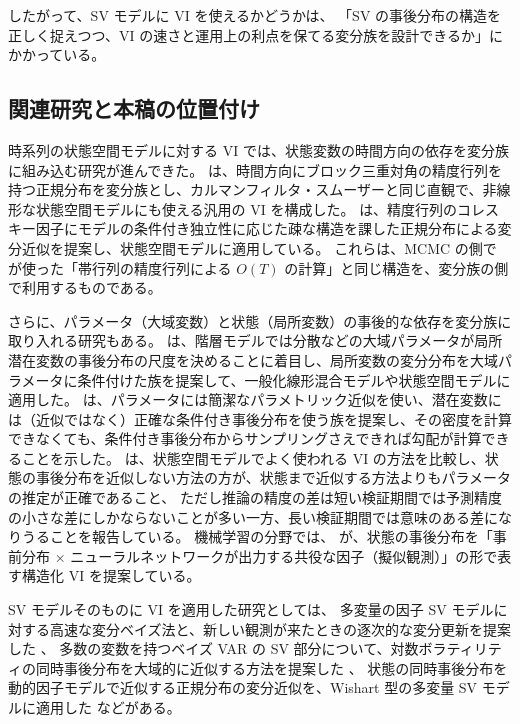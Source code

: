 したがって、SV モデルに VI を使えるかどうかは、
「SV の事後分布の構造を正しく捉えつつ、VI の速さと運用上の利点を保てる変分族を設計できるか」にかかっている。

\subsection{関連研究と本稿の位置付け}\label{sec:intro-related}

時系列の状態空間モデルに対する VI では、状態変数の時間方向の依存を変分族に組み込む研究が進んできた。
\textcite{archer2015} は、時間方向にブロック三重対角の精度行列を持つ正規分布を変分族とし、カルマンフィルタ・スムーザーと同じ直観で、非線形な状態空間モデルにも使える汎用の VI を構成した。
\textcite{tan2018} は、精度行列のコレスキー因子にモデルの条件付き独立性に応じた疎な構造を課した正規分布による変分近似を提案し、状態空間モデルに適用している。
これらは、MCMC の側で \textcite{chan2009} が使った「帯行列の精度行列による $O(T)$ の計算」と同じ構造を、変分族の側で利用するものである。

さらに、パラメータ（大域変数）と状態（局所変数）の事後的な依存を変分族に取り入れる研究もある。
\textcite{tan2020} は、階層モデルでは分散などの大域パラメータが局所潜在変数の事後分布の尺度を決めることに着目し、局所変数の変分分布を大域パラメータに条件付けた族を提案して、一般化線形混合モデルや状態空間モデルに適用した。
\textcite{loaizamaya2022} は、パラメータには簡潔なパラメトリック近似を使い、潜在変数には（近似ではなく）正確な条件付き事後分布を使う族を提案し、その密度を計算できなくても、条件付き事後分布からサンプリングさえできれば勾配が計算できることを示した。
\textcite{frazier2023} は、状態空間モデルでよく使われる VI の方法を比較し、状態の事後分布を近似しない方法の方が、状態まで近似する方法よりもパラメータの推定が正確であること、
ただし推論の精度の差は短い検証期間では予測精度の小さな差にしかならないことが多い一方、長い検証期間では意味のある差になりうることを報告している。
機械学習の分野では、\textcite{johnson2016} が、状態の事後分布を「事前分布 × ニューラルネットワークが出力する共役な因子（擬似観測）」の形で表す構造化 VI を提案している。

SV モデルそのものに VI を適用した研究としては、
多変量の因子 SV モデルに対する高速な変分ベイズ法と、新しい観測が来たときの逐次的な変分更新を提案した \textcite{gunawan2021}、
多数の変数を持つベイズ VAR の SV 部分について、対数ボラティリティの同時事後分布を大域的に近似する方法を提案した \textcite{chan2022}、
状態の同時事後分布を動的因子モデルで近似する正規分布の変分近似を、Wishart 型の多変量 SV モデルに適用した \textcite{quiroz2023} などがある。

